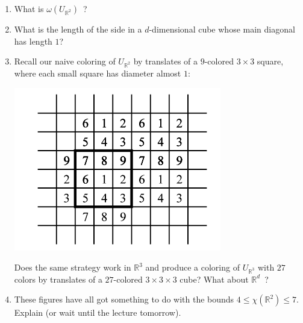 \documentclass[a4paper]{article}
\newcommand{\RR}{\mathbb{R}}
\begin{document}
\begin{enumerate}
\item What is $\omega(U_{\RR^2})$\ ?

\item What is the length of the side in a $d$-dimensional cube whose main diagonal has length $1$?

\item Recall our naive coloring of $U_{\RR^2}$ by translates of a $9$-colored $3\times 3$ square, where each small square has diameter almost $1$:

\begin{center}
\includegraphics[scale=0.4]{mf8.png}
\end{center}

Does the same strategy work in $\RR^3$ and produce a coloring of $U_{\RR^3}$ with $27$ colors by translates of a $27$-colored $3\times 3\times 3$ cube? What about $\RR^d$\ 	?

\item These figures have all got something to do with the bounds $4\leq\chi(\RR^2)\leq 7$. Explain (or wait until the lecture tomorrow).


\end{enumerate}
\end{document}
